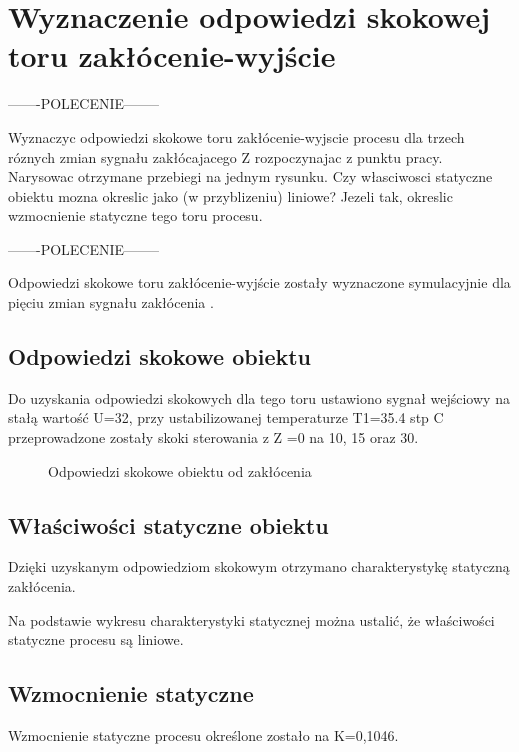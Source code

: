 \section{Wyznaczenie odpowiedzi skokowej toru zakłócenie-wyjście}
\label{lab:zad2}


-------POLECENIE--------

Wyznaczyc odpowiedzi skokowe toru zakłócenie-wyjscie procesu dla trzech róznych
zmian sygnału zakłócajacego Z rozpoczynajac z punktu pracy. Narysowac otrzymane
przebiegi na jednym rysunku. Czy własciwosci statyczne obiektu mozna okreslic jako
(w przyblizeniu) liniowe? Jezeli tak, okreslic wzmocnienie statyczne tego toru procesu.

-------POLECENIE--------

Odpowiedzi skokowe toru zakłócenie-wyjście zostały wyznaczone symulacyjnie dla pięciu
zmian sygnału zakłócenia .

\subsection{Odpowiedzi skokowe obiektu}
\label{lab:zad2:odpSkok}

Do uzyskania odpowiedzi skokowych dla tego toru ustawiono sygnał wejściowy na stałą
wartość U=32, 
przy ustabilizowanej temperaturze T1=35.4 stp C przeprowadzone zostały
skoki sterowania z Z =0 na 10, 15 oraz 30.

\begin{figure}[H] 
    \centering
    
    \caption{Odpowiedzi skokowe obiektu od zakłócenia}
    \label{lab:zad2:odpSkok:figure}
\end{figure}


\subsection{Właściwości statyczne obiektu}
\label{lab:zad2:charStat}

Dzięki uzyskanym odpowiedziom skokowym otrzymano charakterystykę statyczną
zakłócenia.


Na podstawie wykresu charakterystyki statycznej można ustalić, 
że właściwości statyczne procesu są liniowe. 

\subsection{Wzmocnienie statyczne}
\label{lab:zad2:wzmStat}

Wzmocnienie statyczne procesu określone zostało na K=0,1046.
